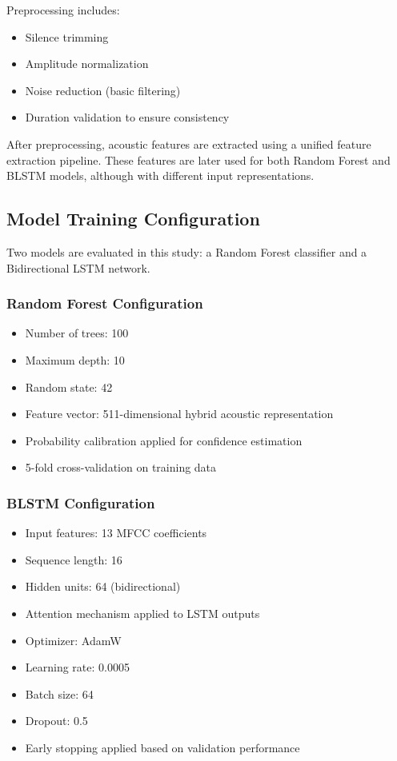 \documentclass[conference]{IEEEtran}
\begin{document}
Preprocessing includes:

\begin{itemize}
\item Silence trimming
\item Amplitude normalization
\item Noise reduction (basic filtering)
\item Duration validation to ensure consistency
\end{itemize}

After preprocessing, acoustic features are extracted using a unified feature extraction pipeline. These features are later used for both Random Forest and BLSTM models, although with different input representations.

\subsection{Model Training Configuration}

Two models are evaluated in this study: a Random Forest classifier and a Bidirectional LSTM network.

\subsubsection{Random Forest Configuration}

\begin{itemize}
\item Number of trees: 100
\item Maximum depth: 10
\item Random state: 42
\item Feature vector: 511-dimensional hybrid acoustic representation
\item Probability calibration applied for confidence estimation
\item 5-fold cross-validation on training data
\end{itemize}

\subsubsection{BLSTM Configuration}

\begin{itemize}
\item Input features: 13 MFCC coefficients
\item Sequence length: 16
\item Hidden units: 64 (bidirectional)
\item Attention mechanism applied to LSTM outputs
\item Optimizer: AdamW
\item Learning rate: 0.0005
\item Batch size: 64
\item Dropout: 0.5
\item Early stopping applied based on validation performance
\end{itemize}
\end{document}
